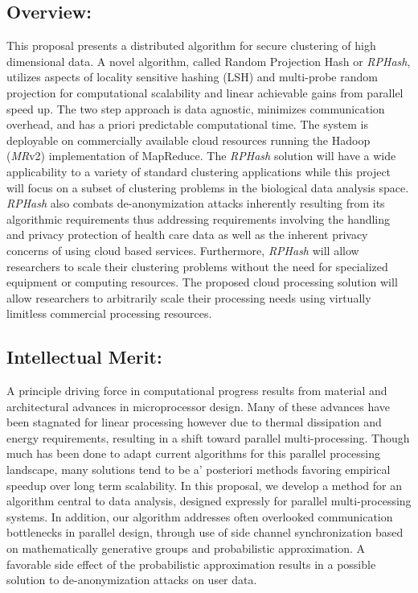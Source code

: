 \documentclass[a4paper,10pt]{article}
\begin{document}
\subsection*{Overview: } 
This proposal presents a
distributed algorithm for secure clustering of high dimensional data.  A novel
algorithm, called Random Projection Hash or \emph{RPHash}, utilizes aspects
of locality sensitive hashing (LSH) and multi-probe random projection for
computational scalability and linear achievable gains from parallel speed up.
The two step approach is data agnostic, minimizes communication overhead,
and has a priori predictable computational time.  The system is deployable
on commercially available cloud resources running the Hadoop (\emph{MR}v2)
implementation of MapReduce.  The \emph{RPHash} solution will have a wide
applicability to a variety of standard clustering applications while this
project will focus on a subset of clustering problems in the biological
data analysis space.  \emph{RPHash} also combats de-anonymization attacks
inherently resulting from its algorithmic requirements thus addressing
requirements involving the handling and privacy protection of health care
data\cite{presidential} as well as the inherent privacy concerns of using
cloud based services.  Furthermore, \emph{RPHash} will allow researchers to
scale their clustering problems without the need for specialized equipment
or computing resources.  The proposed cloud processing solution will allow
researchers to arbitrarily scale their processing needs using virtually
limitless commercial processing resources.

\subsection*{Intellectual Merit: } A principle driving force in computational
progress results from material and architectural advances in microprocessor
design. Many of these advances have been stagnated for linear processing
however due to thermal dissipation and energy requirements, resulting in a
shift toward parallel multi-processing.  Though much has been done to adapt
current algorithms for this parallel processing landscape, many solutions
tend to be a' posteriori methods favoring empirical speedup over long
term scalability. In this proposal, we develop a method for an algorithm
central to data analysis, designed expressly for parallel multi-processing
systems. In addition, our algorithm addresses often overlooked communication
bottlenecks in parallel design, through use of side channel synchronization
based on mathematically generative groups and probabilistic approximation. A
favorable side effect of the probabilistic approximation results in a possible
solution to de-anonymization attacks\cite{deanon1}\cite{deanon2} on user data.
\end{document}
